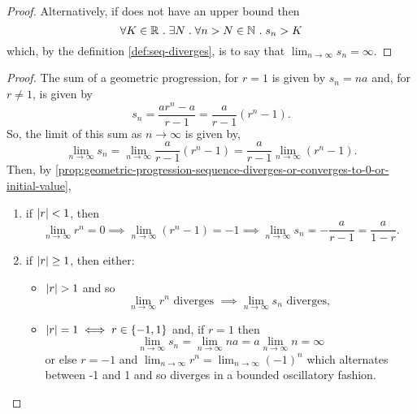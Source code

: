 \documentclass[../MathsNotesBase.tex]{subfiles}
\begin{document}
{\begin{proof}
			Alternatively, if does not have an upper bound then
			\[ \forall K \in \mathbb{R}^{} \;.\; \exists N \;.\; \forall n > N \in \mathbb{N}^{} \;.\; s_n > K \]
			which, by the definition \ref{def:seq-diverges}, is to say that ${ \lim_{n \to \infty} s_n = \infty }$.
		\end{proof}
	
	
		
		\nl[20]
		\label{ssssection:well-known-non-negative-series}
		\medskip
		\begin{proof}\nl
			The sum of a geometric progression, for ${ r = 1 }$ is given by ${ s_n = na }$ and, for ${ r \neq 1 }$, is given by
			\[ s_n = \frac{ar^n - a}{r - 1} = \frac{a}{r - 1} (r^n - 1). \]
			So, the limit of this sum as ${ n \to \infty }$ is given by,
			\[ \lim_{n \to \infty} s_n = \lim_{n \to \infty} \frac{a}{r - 1} (r^n - 1) = \frac{a}{r - 1} \lim_{n \to \infty} (r^n - 1). \]
			Then, by \autoref{prop:geometric-progression-sequence-diverges-or-converges-to-0-or-initial-value},
			\begin{enumerate}[label=(\roman*)]
				\item{if ${ \left\lvert r\right\rvert < 1 }$, then
					\[ \lim_{n \to \infty} r^n = 0 \implies \lim_{n \to \infty} (r^n - 1) = -1 \implies \lim_{n \to \infty} s_n = -\frac{a}{r - 1} = \frac{a}{1 - r}. \]
				}
				\item{if ${ \left\lvert r\right\rvert \geq 1 }$, then either:
					\begin{itemize}
						\item{${ \left\lvert r\right\rvert > 1 }$ and so
							\[ \lim_{n \to \infty} r^n \text{ diverges } \implies \lim_{n \to \infty} s_n \text{ diverges, } \]
						}
						\item{${ \left\lvert r\right\rvert = 1 \iff r \in \{-1, 1\} }$ and, if ${ r = 1 }$ then
							\[ \lim_{n \to \infty} s_n = \lim_{n \to \infty} na = a \lim_{n \to \infty} n = \infty \]
							or else ${ r = -1 }$ and ${ \lim_{n \to \infty} r^n = \lim_{n \to \infty} (-1)^n }$ which alternates between -1 and 1 and so diverges in a bounded oscillatory fashion.
						}
					\end{itemize}
				}
			\end{enumerate}
		\end{proof}
	
}
\end{document}
